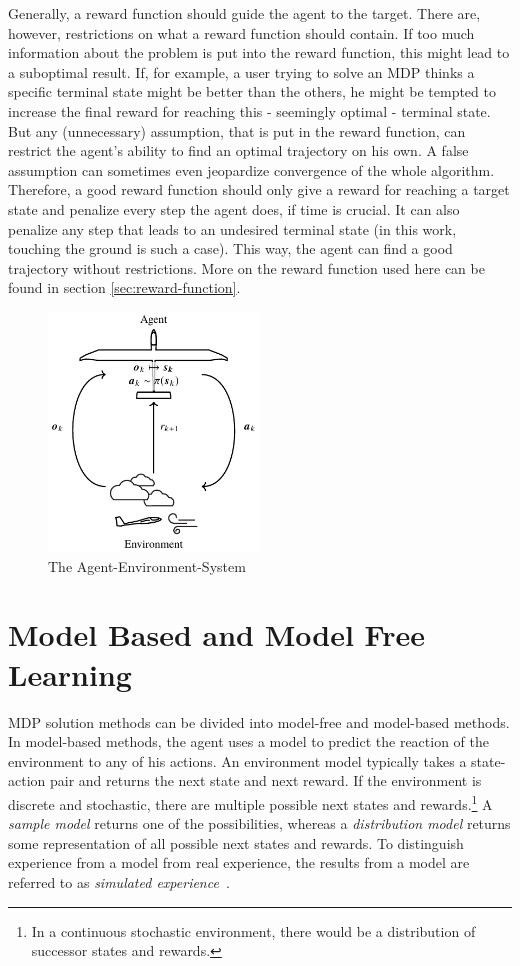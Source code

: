 Generally, a reward function should guide the agent to the target. There are, however, restrictions on what a reward function should contain. If too much information about the problem is put into the reward function, this might lead to a suboptimal result. If, for example, a user trying to solve an MDP thinks a specific terminal state might be better than the others, he might be tempted to increase the final reward for reaching this - seemingly optimal - terminal state. But any (unnecessary) assumption, that is put in the reward function, can restrict the agent's ability to find an optimal trajectory on his own. A false assumption can sometimes even jeopardize convergence of the whole algorithm. Therefore, a good reward function should only give a reward for reaching a target state and penalize every step the agent does, if time is crucial. It can also penalize any step that leads to an undesired terminal state (in this work, touching the ground is such a case). This way, the agent can find a good trajectory without restrictions. More on the reward function used here can be found in section \ref{sec:reward-function}.

\begin{figure}[h]
	\centering
	\includegraphics[width=0.5\textwidth]{src/pics/RLProblem.pdf}
	\caption{The Agent-Environment-System~\cite{Notter2018}}
	\label{fig:agent_env_system} 
\end{figure}

\section{Model Based and Model Free Learning}
\label{sec:modelbasedmodelfree}

MDP solution methods can be divided into model-free and model-based methods. In model-based methods, the agent uses a model to predict the reaction of the environment to any of his actions. An environment model typically takes a state-action pair and returns the next state and next reward. If the environment is discrete and stochastic, there are multiple possible next states and rewards.\footnote{In a continuous stochastic environment, there would be a distribution of successor states and rewards.} A \textit{sample model} returns one of the possibilities, whereas a \textit{distribution model} returns some representation of all possible next states and rewards. To distinguish experience from a model from real experience, the results from a model are referred to as \textit{simulated experience}~\cite[section~8.1]{SuttonBarto2018}.

